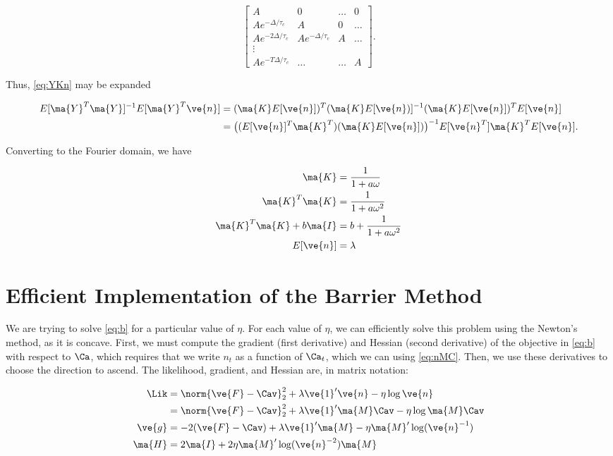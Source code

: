 \begin{equation}
\begin{bmatrix}
A&0&\ldots&0\\
Ae^{-\Delta/\tau_c}&A&0&\ldots\\
Ae^{-2\Delta/\tau_c}&Ae^{-\Delta/\tau_c}&A&\ldots\\
\vdots\\
Ae^{-T\Delta/\tau_c}&\ldots&\ldots&A
\end{bmatrix}.
\end{equation}

Thus, \eqref{eq:YKn} may be expanded

\begin{align}
E[\ma{Y}^T\ma{Y}]^{-1}E[\ma{Y}^T\ve{n}] &= (\ma{K}E[\ve{n}])^T(\ma{K}E[\ve{n})]^{-1} (\ma{K}E[\ve{n}])^T E[\ve{n}]\\
&=\big((E[\ve{n}]^T\ma{K}^T)(\ma{K}E[\ve{n}])\big)^{-1}E[\ve{n}^T]\ma{K}^TE[\ve{n}].
\end{align}

Converting to the Fourier domain, we have

\begin{align}
\ma{K} &= \frac{1}{1+a\omega}\\
\ma{K}^T\ma{K} &= \frac{1}{1+a\omega^2}\\
\ma{K}^T\ma{K}+b\ma{I} &= b+\frac{1}{1+a\omega^2}\\
E[\ve{n}] &= \lambda
\end{align}


\section{Efficient Implementation of the Barrier Method} \label{sec:bar}

We are trying to solve \eqref{eq:b} for a particular value of $\eta$.  For each value of $\eta$, we can efficiently solve this problem using the Newton's method, as it is concave. First, we must compute the gradient (first derivative) and Hessian (second derivative) of the objective in \eqref{eq:b} with respect to $\Ca$, which requires that we write $n_t$ as a function of $\Ca_t$, which we can using \eqref{eq:nMC}. Then, we use these derivatives to choose the direction to ascend. The likelihood, gradient, and Hessian are, in matrix notation:

\begin{align}
\Lik &= \norm{\ve{F}-\Cav}^2_2 + \lambda \ve{1}' \ve{n} - \eta \log \ve{n}\\
&= \norm{\ve{F}-\Cav}^2_2 + \lambda \ve{1}' \ma{M} \Cav - \eta \log \ma{M} \Cav\\
\ve{g} &= -2(\ve{F}-\Cav) +\lambda \ve{1}' \ma{M} - \eta \ma{M}' \log (\ve{n}^{-1}) \label{eq:g}\\
\ma{H} &= 2\ma{I} + 2 \eta \ma{M}' \log(\ve{n}^{-2}) \ma{M} \label{eq:H}
\end{align}

